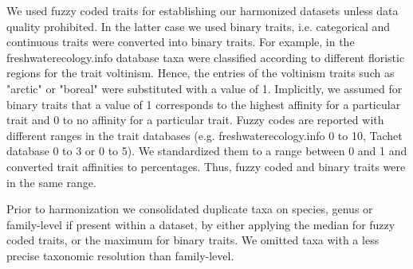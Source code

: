 \documentclass{article}
\begin{document}
We used fuzzy coded traits for establishing our harmonized datasets unless data quality prohibited. In the latter case we used binary traits, i.e. categorical and continuous traits were converted into binary traits. For example, in the  freshwaterecology.info database taxa were classified according to different floristic regions for the trait voltinism. Hence, the entries of the voltinism traits such as "arctic" or "boreal" were substituted with a value of 1. Implicitly, we assumed for binary traits that a value of 1 corresponds to the highest affinity for a particular trait and 0 to no affinity for a particular trait. Fuzzy codes are reported with different ranges in the trait databases (e.g. freshwaterecology.info 0 to 10, Tachet database 0 to 3 or 0 to 5). We standardized them to a range between 0 and 1 and converted trait affinities to percentages. Thus, fuzzy coded and binary traits were in the same range. 

Prior to harmonization we consolidated duplicate taxa on species, genus or family-level if present within a dataset, by either applying the median for fuzzy coded traits, or the maximum for binary traits. We omitted taxa with a less precise taxonomic resolution than family-level.
\end{document}
